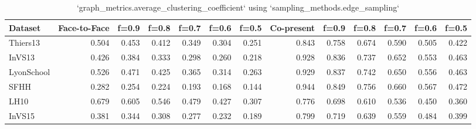 \begin{table}[ht]
\begin{tabular}{lrrrrrrrrrrrr}
\hline
 Dataset    &   Face-to-Face &   f=0.9 &   f=0.8 &   f=0.7 &   f=0.6 &   f=0.5 &   Co-present &   f=0.9 &   f=0.8 &   f=0.7 &   f=0.6 &   f=0.5 \\
\hline
 Thiers13   &          0.504 &   0.453 &   0.412 &   0.349 &   0.304 &   0.251 &        0.843 &   0.758 &   0.674 &   0.590 &   0.505 &   0.422 \\
 InVS13     &          0.426 &   0.384 &   0.333 &   0.298 &   0.260 &   0.218 &        0.928 &   0.836 &   0.737 &   0.652 &   0.553 &   0.463 \\
 LyonSchool &          0.526 &   0.471 &   0.425 &   0.365 &   0.314 &   0.263 &        0.929 &   0.837 &   0.742 &   0.650 &   0.556 &   0.463 \\
 SFHH       &          0.282 &   0.254 &   0.224 &   0.193 &   0.168 &   0.144 &        0.944 &   0.849 &   0.756 &   0.660 &   0.567 &   0.472 \\
 LH10       &          0.679 &   0.605 &   0.546 &   0.479 &   0.427 &   0.307 &        0.776 &   0.698 &   0.610 &   0.536 &   0.450 &   0.360 \\
 InVS15     &          0.381 &   0.344 &   0.308 &   0.277 &   0.232 &   0.189 &        0.799 &   0.719 &   0.639 &   0.559 &   0.484 &   0.399 \\
\hline
\end{tabular}
\caption{`graph_metrics.average_clustering_coefficient` using `sampling_methods.edge_sampling`}
\end{table}